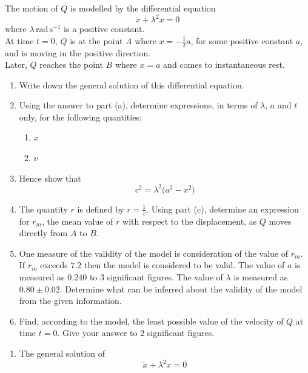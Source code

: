 \documentclass[leqno]{article}
\begin{document}
\begin{enumerate}[
  label=\textbf{\arabic*.},
  leftmargin=*,
  topsep=0pt,
  partopsep=0pt,
  parsep=0pt
]
The motion of $Q$ is modelled by the differential equation \[\ddot{x}+\lambda^2 x=0\] where $\lambda\,\mathrm{rad\,s^{-1}}$ is a positive constant. \\

At time $t=0$, $Q$ is at the point $A$ where $x=-\tfrac{1}{2}a$, for some positive constant $a$, and is moving in the positive direction. \\

Later, $Q$ reaches the point $B$ where $x=a$ and comes to instantaneous rest. \\
\begin{enumerate}[label=\textbf{(\alph*)}]
  \item Write down the general solution of this differential equation. 
  \item Using the answer to part (a), determine expressions, in terms of $\lambda$, $a$ and $t$ only, for the following quantities:
  \begin{enumerate}[label=(\roman*)]
    \item $x$
    \item $v$
  \end{enumerate}
  \item Hence show that
  \[ v^2=\lambda^2\bigl(a^2-x^2\bigr) \]
  \item The quantity $r$ is defined by $r=\frac{1}{v}$. Using part (c), determine an expression for $r_m$, the mean value of $r$ with respect to the displacement, as $Q$ moves directly from $A$ to $B$. 
  \item One measure of the validity of the model is consideration of the value of $r_m$. If $r_m$ exceeds $7.2$ then the model is considered to be valid. The value of $a$ is measured as $0.240$ to $3$ significant figures. The value of $\lambda$ is measured as $0.80\pm 0.02$. Determine what can be inferred about the validity of the model from the given information. 
  \item Find, according to the model, the least possible value of the velocity of $Q$ at time $t=0$. Give your answer to $2$ significant figures. 
\end{enumerate}

\vspace*{10pt}

\begin{djsSolution}
\begin{enumerate}[label=\textbf{(\alph*)}]
  \item The general solution of
  \[
  \ddot{x}+\lambda^2x=0
  \]


\end{enumerate}
\end{djsSolution}
\end{enumerate}
\end{document}
